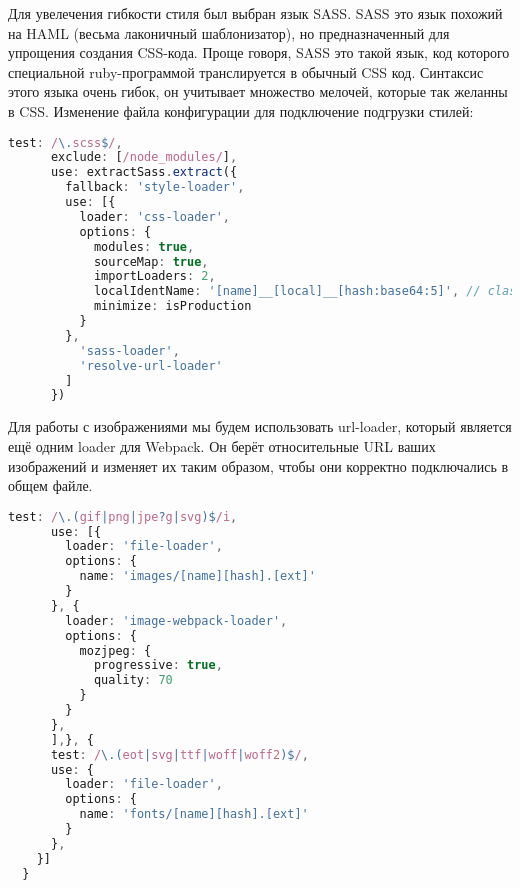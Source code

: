 Для увелечения гибкости стиля был выбран язык SASS. SASS это язык похожий на HAML (весьма лаконичный шаблонизатор), но предназначенный 
для упрощения создания CSS-кода. Проще говоря, SASS это такой язык, код которого специальной ruby-программой транслируется в обычный CSS код. Синтаксис этого языка очень гибок, 
он учитывает множество мелочей, которые так желанны в CSS. 
Изменение файла конфигурации для подключение подгрузки стилей:

\begin{lstlisting}[language=TypeScript, label=lst:domain:html]
test: /\.scss$/,
      exclude: [/node_modules/],
      use: extractSass.extract({
        fallback: 'style-loader',
        use: [{
          loader: 'css-loader',
          options: {
            modules: true,
            sourceMap: true,
            importLoaders: 2,
            localIdentName: '[name]__[local]__[hash:base64:5]', // className template
            minimize: isProduction
          }
        },
          'sass-loader',
          'resolve-url-loader'
        ]
      })
\end{lstlisting}

Для работы с изображениями мы будем использовать url-loader, который является ещё одним loader для Webpack. Он берёт относительные URL 
ваших изображений и изменяет их таким образом, чтобы они корректно подключались в общем файле.
\begin{lstlisting}[language=TypeScript, label=lst:domain:html]
test: /\.(gif|png|jpe?g|svg)$/i,
      use: [{
        loader: 'file-loader',
        options: {
          name: 'images/[name][hash].[ext]'
        }
      }, {
        loader: 'image-webpack-loader',
        options: {
          mozjpeg: {
            progressive: true,
            quality: 70
          }
        }
      },
      ],}, {
      test: /\.(eot|svg|ttf|woff|woff2)$/,
      use: {
        loader: 'file-loader',
        options: {
          name: 'fonts/[name][hash].[ext]'
        }
      },
    }]
  }
\end{lstlisting}
